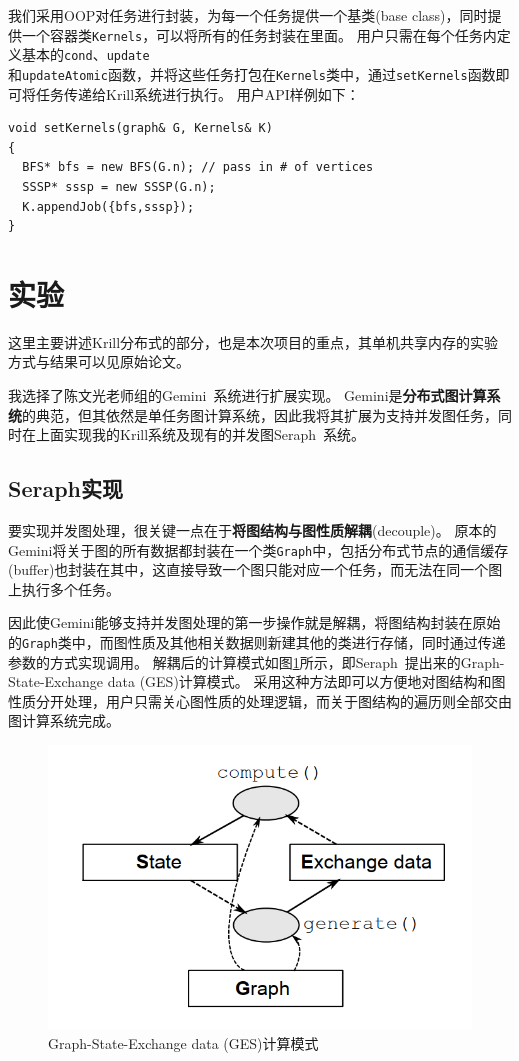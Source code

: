 \documentclass[logo,reportComp]{thesis}
\begin{document}
我们采用OOP对任务进行封装，为每一个任务提供一个基类(base class)，同时提供一个容器类\verb'Kernels'，可以将所有的任务封装在里面。
用户只需在每个任务内定义基本的\verb'cond'、\verb'update'\\
和\verb'updateAtomic'函数，并将这些任务打包在\verb'Kernels'类中，通过\verb'setKernels'函数即可将任务传递给Krill系统进行执行。
用户API样例如下：
\begin{lstlisting}
void setKernels(graph& G, Kernels& K)
{
  BFS* bfs = new BFS(G.n); // pass in # of vertices
  SSSP* sssp = new SSSP(G.n);
  K.appendJob({bfs,sssp});
}
\end{lstlisting}


\section{实验}
这里主要讲述Krill分布式的部分，也是本次项目的重点，其单机共享内存的实验方式与结果可以见原始论文。

我选择了陈文光老师组的Gemini~\cite{zhu:gemini_osdi_2016}系统进行扩展实现。
Gemini是\textbf{分布式图计算系统}的典范，但其依然是单任务图计算系统，因此我将其扩展为支持并发图任务，同时在上面实现我的Krill系统及现有的并发图Seraph~\cite{xue:seraph_hpdc_2014}系统。

\subsection{Seraph实现}
要实现并发图处理，很关键一点在于\textbf{将图结构与图性质解耦}(decouple)。
原本的Gemini将关于图的所有数据都封装在一个类\verb'Graph'中，包括分布式节点的通信缓存(buffer)也封装在其中，这直接导致一个图只能对应一个任务，而无法在同一个图上执行多个任务。

因此使Gemini能够支持并发图处理的第一步操作就是解耦，将图结构封装在原始的\verb'Graph'类中，而图性质及其他相关数据则新建其他的类进行存储，同时通过传递参数的方式实现调用。
解耦后的计算模式如图\ref{fig:ges}所示，即Seraph~\cite{xue:seraph_hpdc_2014}提出来的Graph-State-Exchange data (GES)计算模式。
采用这种方法即可以方便地对图结构和图性质分开处理，用户只需关心图性质的处理逻辑，而关于图结构的遍历则全部交由图计算系统完成。
\begin{figure}[H]
\centering
\includegraphics[width=0.6\linewidth]{fig/GES.png}
\caption{Graph-State-Exchange data (GES)计算模式}
\label{fig:ges}
\end{figure}
\end{document}
